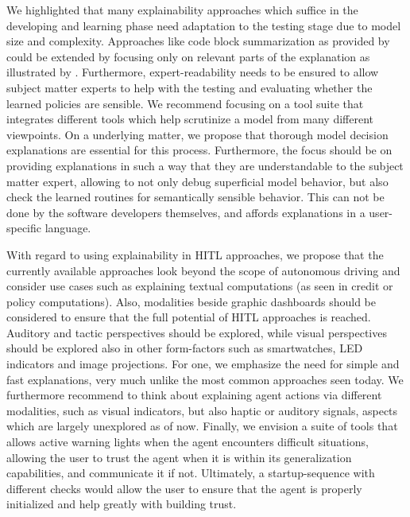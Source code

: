 \documentclass[twoside,11pt]{article}
\begin{document}
We highlighted that many explainability approaches which suffice in the developing and learning phase need adaptation to the testing stage due to model size and complexity. Approaches like code block summarization as provided by \citet{VermaEtAl:2018:ProgrammaticallyInterpretableRL} could be extended by focusing only on relevant parts of the explanation as illustrated by \citet{Vu:2020:PGMExplainer}. Furthermore, expert-readability needs to be ensured to allow subject matter experts to help with the testing and evaluating whether the learned policies are sensible.
We recommend focusing on a tool suite that integrates different tools which help scrutinize a model from many different viewpoints. On a underlying matter, we propose that thorough model decision explanations are essential for this process. Furthermore, the focus should be on providing explanations in such a way that they are understandable to the subject matter expert, allowing to not only debug superficial model behavior, but also check the learned routines for semantically sensible behavior. This can not be done by the software developers themselves, and affords explanations in a user-specific language.


With regard to using explainability in HITL approaches, we propose that the currently available approaches look beyond the scope of autonomous driving and consider use cases such as explaining textual computations (as seen in credit or policy computations). Also, modalities beside graphic dashboards should be considered to ensure that the full potential of HITL approaches is reached. Auditory and tactic perspectives should be explored, while visual perspectives should be explored also in other form-factors such as smartwatches, LED indicators and image projections.
For one, we emphasize the need for simple and fast explanations, very much unlike the most common approaches seen today. We furthermore recommend to think about explaining agent actions via different modalities, such as visual indicators, but also haptic or auditory signals, aspects which are largely unexplored as of now. Finally, we envision a suite of tools that allows active warning lights when the agent encounters difficult situations, allowing the user to trust the agent when it is within its generalization capabilities, and communicate it if not. Ultimately, a startup-sequence with different checks would allow the user to ensure that the agent is properly initialized and help greatly with building trust.
\end{document}
